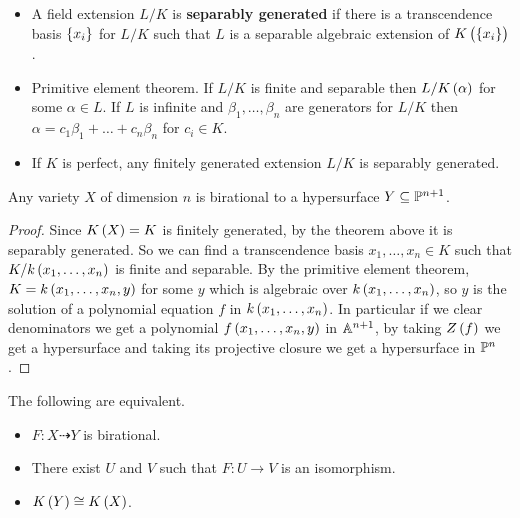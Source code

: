 \begin{definition}
\hfill
\begin{itemize}
\item A field extension $ L / K $ is \textbf{separably generated} if there is a transcendence basis $ \cbr{x_i} $ for $ L / K $ such that $ L $ is a separable algebraic extension of $ K\br{\cbr{x_i}} $.
\item Primitive element theorem. If $ L / K $ is finite and separable then $ L / K\br{\alpha} $ for some $ \alpha \in L $. If $ L $ is infinite and $ \beta_1, \dots, \beta_n $ are generators for $ L / K $ then $ \alpha = c_1\beta_1 + \dots + c_n\beta_n $ for $ c_i \in K $.
\item If $ K $ is perfect, any finitely generated extension $ L / K $ is separably generated.
\end{itemize}
\end{definition}

\begin{theorem}
Any variety $ X $ of dimension $ n $ is birational to a hypersurface $ Y \subseteq \PP^{n + 1} $.
\end{theorem}

\begin{proof}
Since $ K\br{X} = K $ is finitely generated, by the theorem above it is separably generated. So we can find a transcendence basis $ x_1, \dots, x_n \in K $ such that $ K / k\br{x_1, \dots, x_n} $ is finite and separable. By the primitive element theorem, $ K = k\br{x_1, \dots, x_n, y} $ for some $ y $ which is algebraic over $ k\br{x_1, \dots, x_n} $, so $ y $ is the solution of a polynomial equation $ f $ in $ k\br{x_1, \dots, x_n} $. In particular if we clear denominators we get a polynomial $ f\br{x_1, \dots, x_n, y} $ in $ \AA^{n + 1} $, by taking $ Z\br{f} $ we get a hypersurface and taking its projective closure we get a hypersurface in $ \PP^n $.
\end{proof}


\begin{corollary}
The following are equivalent.
\begin{itemize}
\item $ F : X \dashrightarrow Y $ is birational.
\item There exist $ U $ and $ V $ such that $ F : U \to V $ is an isomorphism.
\item $ K\br{Y} \cong K\br{X} $.
\end{itemize}
\end{corollary}

